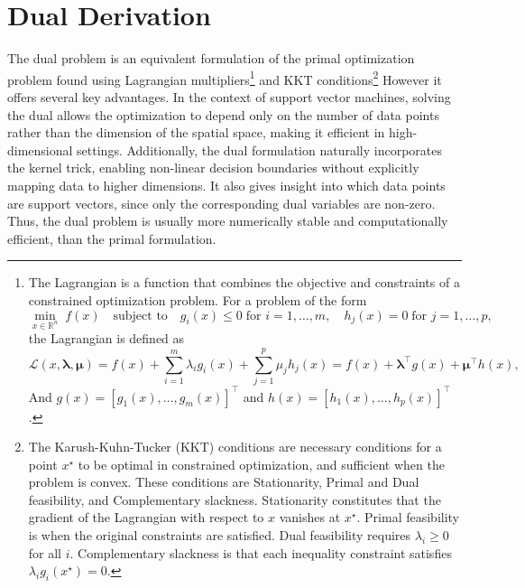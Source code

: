 \section{Dual Derivation}\label{chap:dual_derivation}
The dual problem is an equivalent formulation of the primal optimization problem found using Lagrangian
multipliers\footnote{The Lagrangian is a function that combines the objective and constraints of a 
constrained optimization problem. For a problem of the form
\[
\min_{x \in \mathbb{R}^n} \; f(x) \quad \text{subject to} \quad g_i(x) \le 0 \; \text{for } i = 1, 
\ldots, m, \quad h_j(x) = 0 \; \text{for } j = 1, \ldots, p,
\]
the Lagrangian is defined as
\[
\mathcal{L}(x, \boldsymbol{\lambda}, \boldsymbol{\mu}) 
= f(x) + \sum_{i=1}^m \lambda_i g_i(x) + \sum_{j=1}^p \mu_j h_j(x) 
= f(x) + \boldsymbol{\lambda}^\top g(x) + \boldsymbol{\mu}^\top h(x),
\]
And $g(x) = [g_1(x), \ldots, g_m(x)]^\top$ and $h(x) = [h_1(x), \ldots, h_p(x)]^\top$.
} 
and KKT conditions\footnote{The Karush-Kuhn-Tucker (KKT) conditions are necessary conditions 
for a point $x^\star$ to be optimal in constrained optimization, and sufficient when the problem 
is convex. These conditions are Stationarity, Primal and Dual feasibility, and Complementary slackness. 
Stationarity constitutes that the gradient of the Lagrangian with respect to $x$ vanishes at $x^\star$. 
Primal feasibility is when the original constraints are satisfied. Dual feasibility requires 
$\lambda_i \ge 0$ for all $i$. Complementary slackness is that each inequality constraint satisfies 
$\lambda_i g_i(x^\star) = 0$.
}
However it offers several key advantages. In the context of support vector machines, 
solving the dual allows the optimization to depend only on the number of data points rather than 
the dimension of the spatial space, making it efficient in high-dimensional settings. 
Additionally, the dual formulation naturally incorporates the kernel trick, enabling non-linear 
decision boundaries without explicitly mapping data to higher dimensions. It also gives insight 
into which data points are support vectors, since only the corresponding dual variables are non-zero. 
Thus, the dual problem is usually more numerically stable and computationally efficient, than the
primal formulation.

